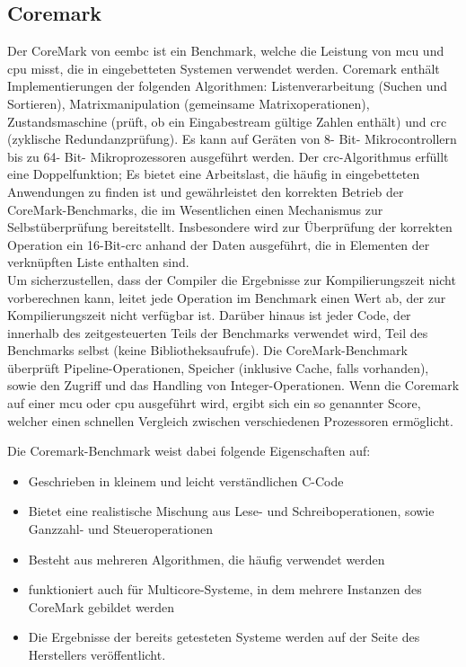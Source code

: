   \subsection{Coremark}\label{kap:coremark}
  Der CoreMark von \ac{eembc} ist ein Benchmark, welche die Leistung von \ac{mcu} und \ac{cpu} misst, die in eingebetteten Systemen verwendet werden.
   Coremark enthält Implementierungen der folgenden Algorithmen: Listenverarbeitung (Suchen und Sortieren),
    Matrixmanipulation (gemeinsame Matrixoperationen), Zustandsmaschine (prüft, ob ein Eingabestream gültige Zahlen enthält) und \ac{crc} (zyklische Redundanzprüfung).
    Es kann auf Geräten von 8- Bit- Mikrocontrollern bis zu 64- Bit- Mikroprozessoren ausgeführt werden.
  Der \ac{crc}-Algorithmus erfüllt eine Doppelfunktion; Es bietet eine Arbeitslast, die häufig in eingebetteten Anwendungen zu finden ist
  und gewährleistet den korrekten Betrieb der CoreMark-Benchmarks, die im Wesentlichen einen Mechanismus zur Selbstüberprüfung bereitstellt.
   Insbesondere wird zur Überprüfung der korrekten Operation ein 16-Bit-\ac{crc} anhand der Daten ausgeführt, die in Elementen der verknüpften Liste enthalten sind.\\
  Um sicherzustellen, dass der Compiler die Ergebnisse zur Kompilierungszeit nicht vorberechnen kann, leitet jede Operation im Benchmark einen Wert ab,
  der zur Kompilierungszeit nicht verfügbar ist. Darüber hinaus ist jeder Code, der innerhalb des zeitgesteuerten Teils der Benchmarks verwendet wird,
  Teil des Benchmarks selbst (keine Bibliotheksaufrufe).
  Die CoreMark-Benchmark überprüft Pipeline-Operationen, Speicher (inklusive Cache, falls vorhanden), sowie den Zugriff und das Handling von Integer-Operationen.
  Wenn die Coremark auf einer \ac{mcu} oder \ac{cpu} ausgeführt wird, ergibt sich ein so genannter Score, welcher einen schnellen Vergleich zwischen verschiedenen Prozessoren ermöglicht.~\cite{coremark}


  Die Coremark-Benchmark weist dabei folgende Eigenschaften auf:
\begin{itemize}
  \item Geschrieben in kleinem und leicht verständlichen C-Code
  \item Bietet eine realistische Mischung aus Lese- und Schreiboperationen, sowie Ganzzahl- und Steueroperationen
  \item Besteht aus mehreren Algorithmen, die häufig verwendet werden
  \item funktioniert auch für Multicore-Systeme, in dem mehrere Instanzen des CoreMark gebildet werden
  \item Die Ergebnisse der bereits getesteten Systeme werden auf der Seite des Herstellers veröffentlicht.
\end{itemize}

